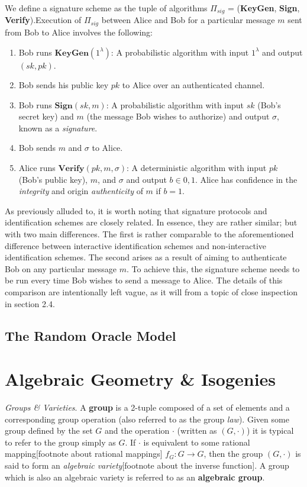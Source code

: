 We define a signature scheme as the tuple of algorithms $\Pi_{sig}$ = (\textbf{KeyGen}, \textbf{Sign}, \textbf{Verify}).Execution of $\Pi_{sig}$ between Alice and Bob for a particular message $m$ sent from Bob to Alice involves the following:
\begin{enumerate}[label=(\roman*)]
\item Bob runs $\textbf{KeyGen}(1^\lambda)$: A probabilistic algorithm with input $1^\lambda$ and output $(sk,pk)$.
\item Bob sends his public key $pk$ to Alice over an authenticated channel.
\item Bob runs $\textbf{Sign}(sk, m)$: A probabilistic algorithm with input $sk$ (Bob's secret key) and $m$ (the message Bob wishes to authorize) and output $\sigma$, known as a \emph{signature}.
\item Bob sends $m$ and $\sigma$ to Alice.
\item Alice runs $\textbf{Verify}(pk, m, \sigma)$: A deterministic algorithm with input $pk$ (Bob's public key), $m$, and $\sigma$ and output $b \in {0,1}$. Alice has confidence in the \emph{integrity} and origin \emph{authenticity} of $m$ if $b = 1$.
\end{enumerate}

As previously alluded to, it is worth noting that signature protocols and identification schemes are closely related. In essence, they are rather similar; but with two main differences. The first is rather comparable to the aforementioned difference between interactive identification schemes and non-interactive identification schemes. The second arises as a result of aiming to authenticate Bob on any particular message $m$. To achieve this, the signature scheme needs to be run every time Bob wishes to send a message to Alice. The details of this comparison are intentionally left vague, as it will from a topic of close inspection in section 2.4.

\subsection{The Random Oracle Model}

\section{Algebraic Geometry \& Isogenies}
\emph{Groups \& Varieties}. A \textbf{group} is a 2-tuple composed of a set of elements and a corresponding group operation (also referred to as the group \emph{law}). Given some group defined by the set $G$ and the operation $\cdot$ (written as $(G,\cdot)$) it is typical to refer to the group simply as $G$. If $\cdot$ is equivalent to some rational mapping[footnote about rational mappings] $f_G: G \rightarrow G$, then the group $(G,\cdot)$ is said to form an \textit{algebraic variety}[footnote about the inverse function]. A group which is also an algebraic variety is referred to as an \textbf{algebraic group}.

